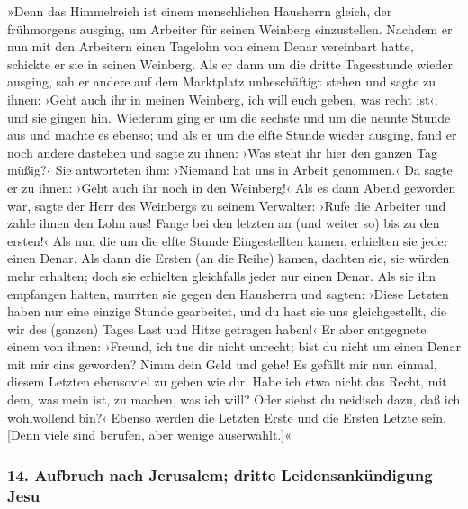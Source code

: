  »Denn das Himmelreich ist einem menschlichen Hausherrn
gleich, der frühmorgens ausging, um Arbeiter für seinen Weinberg
einzustellen.  Nachdem er nun mit den Arbeitern einen
Tagelohn von einem Denar vereinbart hatte, schickte er sie in seinen
Weinberg.  Als er dann um die dritte Tagesstunde wieder
ausging, sah er andere auf dem Marktplatz unbeschäftigt stehen
 und sagte zu ihnen: ›Geht auch ihr in meinen Weinberg,
ich will euch geben, was recht ist‹;  und sie gingen hin.
Wiederum ging er um die sechste und um die neunte Stunde aus und machte
es ebenso;  und als er um die elfte Stunde wieder ausging,
fand er noch andere dastehen und sagte zu ihnen: ›Was steht ihr hier den
ganzen Tag müßig?‹  Sie antworteten ihm: ›Niemand hat uns
in Arbeit genommen.‹ Da sagte er zu ihnen: ›Geht auch ihr noch in den
Weinberg!‹  Als es dann Abend geworden war, sagte der Herr
des Weinbergs zu seinem Verwalter: ›Rufe die Arbeiter und zahle ihnen
den Lohn aus! Fange bei den letzten an (und weiter so) bis zu den
ersten!‹  Als nun die um die elfte Stunde Eingestellten
kamen, erhielten sie jeder einen Denar.  Als dann die
Ersten (an die Reihe) kamen, dachten sie, sie würden mehr erhalten; doch
sie erhielten gleichfalls jeder nur einen Denar.  Als sie
ihn empfangen hatten, murrten sie gegen den Hausherrn 
und sagten: ›Diese Letzten haben nur eine einzige Stunde gearbeitet, und
du hast sie uns gleichgestellt, die wir des (ganzen) Tages Last und
Hitze getragen haben!‹  Er aber entgegnete einem von
ihnen: ›Freund, ich tue dir nicht unrecht; bist du nicht um einen Denar
mit mir eins geworden?  Nimm dein Geld und gehe! Es
gefällt mir nun einmal, diesem Letzten ebensoviel zu geben wie dir.
 Habe ich etwa nicht das Recht, mit dem, was mein ist, zu
machen, was ich will? Oder siehst du neidisch dazu, daß ich wohlwollend
bin?‹  Ebenso werden die Letzten Erste und die Ersten
Letzte sein. {[}Denn viele sind berufen, aber wenige auserwählt.{]}«

\hypertarget{aufbruch-nach-jerusalem-dritte-leidensankuxfcndigung-jesu}{%
\subsubsection{14. Aufbruch nach Jerusalem; dritte Leidensankündigung
Jesu}\label{aufbruch-nach-jerusalem-dritte-leidensankuxfcndigung-jesu}}

